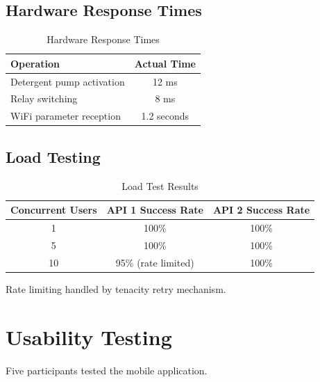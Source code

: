\subsection{Hardware Response Times}
\begin{table}[H]
    \centering
    \begin{tabular}{|l|c|}
        \hline
        \textbf{Operation} & \textbf{Actual Time} \\
        \hline
        Detergent pump activation & 12 ms \\
        \hline
        Relay switching & 8 ms \\
        \hline
        WiFi parameter reception & 1.2 seconds \\
        \hline
    \end{tabular}
    \caption{Hardware Response Times}
    \label{tab:perf_hw}
\end{table}

\subsection{Load Testing}
\begin{table}[H]
    \centering
    \begin{tabular}{|c|c|c|}
        \hline
        \textbf{Concurrent Users} & \textbf{API 1 Success Rate} & \textbf{API 2 Success Rate} \\
        \hline
        1  & 100\% & 100\% \\
        \hline
        5  & 100\% & 100\% \\
        \hline
        10 & 95\% (rate limited) & 100\% \\
        \hline
    \end{tabular}
    \caption{Load Test Results}
    \label{tab:load}
\end{table}
Rate limiting handled by tenacity retry mechanism.

\section{Usability Testing}
Five participants tested the mobile application.

